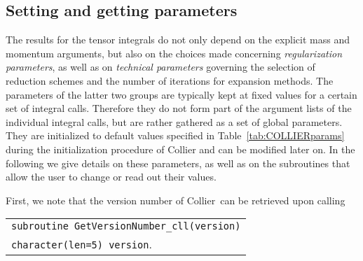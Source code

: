 \documentclass[preprint,sort&compress,12pt]{elsarticle}
\makeatletter
\def\bce{\begin{center}}
\def\ece{\end{center}}
\def\refta#1{\mbox{Table~\ref{#1}}}
\newcommand{\collier}{{\sc Collier}}
\newlength{\parwidth}\newlength{\colonewidth}%
\newcommand{\cpcsub}[1]
{%
\setlength{\parwidth}{\textwidth}\addtolength{\parwidth}{-2.1em}%
\bce
\begin{tabular}[t]{@{}p{\parwidth}@{}}
#1
\end{tabular}
\ece
}%
\makeatother
\begin{document}
\subsection{Setting and getting parameters}
\label{subsec:SetGet}
The results for the tensor integrals do not only depend on the explicit mass and momentum arguments,
but also on the choices made concerning \textit{regularization parameters}, as well as on
\textit{technical parameters} governing the selection of reduction schemes and the number of iterations for expansion methods.
The parameters of the latter two groups are typically kept at fixed values for a certain set of integral calls. Therefore
they do not form part of the argument lists of the individual integral calls, 
but are rather gathered as a set of global parameters.
They are initialized to default values specified in \refta{tab:COLLIERparams} during the initialization procedure
of {\collier} and can be modified later on. In the following we give details on these parameters, as well as on the subroutines
that allow the user to change or read out their values.

First, we note that the version number of \collier\ can be
retrieved upon calling
\cpcsub{
{\tt subroutine  GetVersionNumber\_cll(version)}\\
{\tt character(len=5) version}\;.
}
\end{document}
